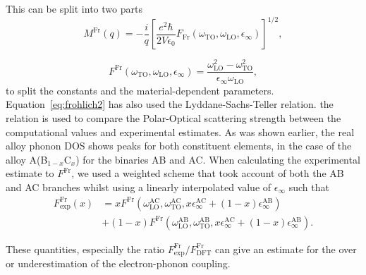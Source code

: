 \documentclass[aps,prmaterials,reprint,amsmath,amssymb,superscriptaddress]{revtex4-2}
\begin{document}
This can be split into two parts
\begin{equation}
    M^\text{Fr}(q) = -\frac{i}{q} \left[ \frac{e^2 \hbar }
    {2V\epsilon_0} F_\text{Fr}(\omega_{\mathrm{TO}},\omega_{\mathrm{LO}},\epsilon_\infty)
    \right]^{1/2},
    \label{eq:frohlich1}
\end{equation}

\begin{equation}
    F^\text{Fr}(\omega_{\mathrm{TO}},\omega_{\mathrm{LO}},\epsilon_\infty) =  \frac{\omega_{\mathrm{LO}}^2 -\omega_{\mathrm{TO}}^2}{\epsilon_\infty \omega_\mathrm{LO}},
    \label{eq:frohlich2}
\end{equation}
to split the constants and the material-dependent parameters. Equation~\ref{eq:frohlich2} has also used the Lyddane-Sachs-Teller relation\cite{LDS}. the relation is used to compare the Polar-Optical scattering strength between the computational values and experimental estimates. As was shown earlier, the real alloy phonon DOS shows peaks for both constituent elements, in the case of the alloy A(B$_{1-x}$C$_x$) for the binaries AB and AC. When calculating the experimental estimate to $F^\text{Fr}$, we used a weighted scheme that took account of both the AB and AC branches whilst using a linearly interpolated value of $\epsilon_\infty$ such that 
\begin{equation}
    \begin{split}
    F_\text{exp}^\text{Fr}(x)&= x F^\text{Fr}(\omega^\text{AC}_\text{LO},\omega^\text{AC}_\text{TO},x\epsilon^\text{AC}_\infty+(1-x)\epsilon^\text{AB}_\infty)\\ &+(1-x) F^\text{Fr}(\omega^\text{AB}_\text{LO},\omega^\text{AB}_\text{TO},x\epsilon^\text{AC}_\infty+(1-x)\epsilon^\text{AB}_\infty).  
    \end{split}
    \label{eq:frohlich_exp}
\end{equation}

These quantities, especially the ratio $F_\text{exp}^\text{Fr}/F_\text{DFT}^\text{Fr}$ can give an estimate for the over or underestimation of the electron-phonon coupling.
\end{document}

